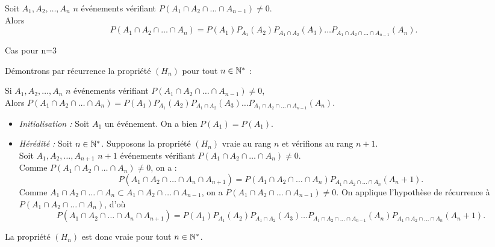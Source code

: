 \documentclass{book}
\begin{document}
\begin{Proposition}
Soit $A_1,A_2,\dots, A_n$ $n$ événements vérifiant $P(A_1\cap A_2\cap \dots \cap A_{n-1})\neq 0$.\\
Alors 
$$P(A_1\cap A_2\cap \dots \cap A_{n})=P(A_1)P_{A_1}(A_2)P_{A_1\cap A_2 }(A_3)\dots P_{A_1\cap A_2\cap \dots \cap A_{n-1}}(A_n).$$
\begin{center}
Cas pour n=3
\end{center}
\end{Proposition}
\begin{Demonstration}
Démontrons par récurrence la propriété $(H_n)$ pour tout $n\in\mathbb{N}^*$ :
\begin{center}
Si $A_1,A_2,\dots, A_n$ $n$ événements vérifiant $P(A_1\cap A_2\cap \dots \cap A_{n-1})\neq 0$,\\
Alors  $P(A_1\cap A_2\cap \dots \cap A_{n})=P(A_1)P_{A_1}(A_2)P_{A_1\cap A_2 }(A_3)\dots P_{A_1\cap A_2\cap \dots \cap A_{n-1}}(A_n).$
\end{center}
\begin{itemize}
\item \textit{Initialisation : } Soit $A_1$ un événement. On a bien $P(A_1)=P(A_1)$.
\item \textit{Hérédité : } Soit $n\in\mathbb{N}^*$. Supposons la propriété $(H_n)$ vraie au rang $n$ et vérifions au rang $n+1$.\\
Soit $A_1,A_2,\dots, A_{n+1}$ $n+1$ événements vérifiant $P(A_1\cap A_2\cap \dots \cap A_{n})\neq 0$. \\
Comme  $P(A_1\cap A_2\cap \dots \cap A_{n})\neq 0$, on a :
$$P(A_1\cap A_2\cap \dots \cap A_{n} \cap A_{n+1})=P(A_1\cap A_2\cap \dots \cap A_{n}) P_{A_1\cap A_2\cap \dots \cap A_{n}}(A_n+1).$$
Comme  $A_1\cap A_2\cap \dots \cap A_{n} \subset A_1\cap A_2\cap \dots \cap A_{n-1}$, on a $P(A_1\cap A_2\cap \dots \cap A_{n-1})\neq 0$. On applique l'hypothèse de récurrence à $P(A_1\cap A_2\cap \dots \cap A_{n})$, d'où 
$$P(A_1\cap A_2\cap \dots \cap A_{n} \cap A_{n+1})=P(A_1)P_{A_1}(A_2)P_{A_1\cap A_2 }(A_3)\dots P_{A_1\cap A_2\cap \dots \cap A_{n-1}}(A_n) P_{A_1\cap A_2\cap \dots \cap A_{n}}(A_n+1).$$
\end{itemize}
La propriété $(H_n)$ est donc vraie pour tout $n\in\mathbb{N}^*$.
\end{Demonstration}
\end{document}
